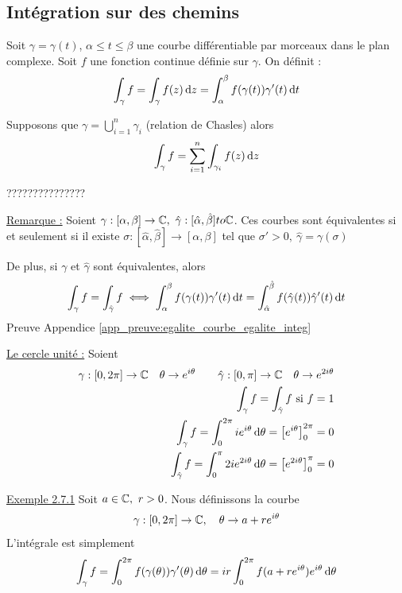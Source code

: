\documentclass[12pt,a4paper]{article}
\begin{document}
\subsection{Intégration sur des chemins}
\begin{boite}
     Soit $\gamma = \gamma(t)$, $\alpha \leq t \leq \beta$ une courbe différentiable par morceaux dans le plan complexe. Soit $f$ une fonction continue définie sur $\gamma$. On définit :
    \begin{equation}
        \int_\gamma f = \int_\gamma f(z) \, \mathrm d z = \int_{\alpha}^{\beta} f(\gamma(t))\gamma'(t) \, \mathrm d t
    \end{equation}
\end{boite}
 Supposons que $\gamma = \bigcup_{i=1}^n \gamma_i$ (relation de Chasles) alors 
\[\int_\gamma f = \sum_{i=1}^{n}\int_{\gamma_i} f(z) \, \mathrm d z\]

???????????????

\uline{Remarque :} Soient $\gamma : [\alpha, \beta] \to \mathbb{C},\ \hat{\gamma} : [\hat{\alpha},\hat{\beta}] to \mathbb{C}$. Ces courbes sont équivalentes si et seulement si il existe $\sigma : [\hat{\alpha},\hat{\beta}] \to  [\alpha, \beta]$ tel que $\sigma' > 0,\ \hat{\gamma} = \gamma(\sigma)$

De plus, si $\gamma$ et $\hat{\gamma}$ sont équivalentes, alors 
\[\int_\gamma f = \int_{\hat{\gamma}} f \iff \int_{\alpha}^{\beta} f(\gamma(t))\gamma'(t) \, \mathrm d t = \int_{\hat{\alpha}}^{\hat{\beta}} f(\hat{\gamma}(t))\hat{\gamma}'(t) \, \mathrm d t\]
Preuve Appendice \ref{app_preuve:egalite_courbe_egalite_integ}

\begin{exemple}
    \uline{Le cercle unité :} Soient 
    \begin{align*}
        \gamma : [0,2\pi] \to \mathbb{C} \quad \theta \to e^{i\theta} \qquad
        \hat{\gamma} : [0,\pi] \to \mathbb{C} \quad \theta \to e^{2i\theta}\\
        \int_\gamma f = \int_{\hat{\gamma}} f \text{ si } f = 1\\
        \int_\gamma f = \int_{0}^{2\pi} ie^{i\theta} \, \mathrm d \theta = \left[e^{i\theta}\right]_0^{2\pi} = 0\\
        \int_{\hat{\gamma}} f = \int_{0}^{\pi} 2ie^{2i\theta} \, \mathrm d \theta = \left[e^{2i\theta}\right]_0^{\pi} = 0
    \end{align*}
\end{exemple}

\begin{exemple}
    \uline{Exemple 2.7.1} Soit $a \in \mathbb{C},\ r > 0$. Nous définissons la courbe 
    \[\gamma : [0,2\pi] \to \mathbb{C},\quad \theta \to a+re^{i\theta}\] 
    L'intégrale est simplement 
    \[\int_\gamma f = \int_0^{2\pi} f(\gamma(\theta)) \gamma'(\theta) \, \mathrm d \theta = ir\int_{0}^{2\pi} f(a+re^{i\theta}) e^{i\theta} \, \mathrm d \theta\]
\end{exemple}
\end{document}
